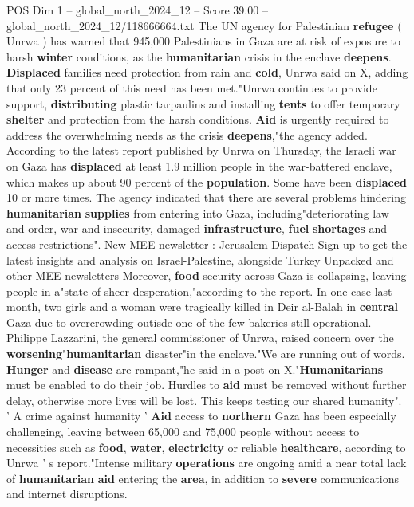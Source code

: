 \begin{textsample}{POS Dim 1 – global\_north\_2024\_12 – Score 39.00 – global\_north\_2024\_12/118666664.txt}  \label{ex:f1_pos_221}
The UN agency for Palestinian \textbf{refugee} ( Unrwa ) has warned that 945,000 Palestinians in Gaza are at risk of exposure to harsh \textbf{winter} conditions, as the \textbf{humanitarian} crisis in the enclave \textbf{deepens}. \textbf{Displaced} families need protection from rain and \textbf{cold}, Unrwa said on X, adding that only 23 percent of this need has been met."Unrwa continues to provide support, \textbf{distributing} plastic tarpaulins and installing \textbf{tents} to offer temporary \textbf{shelter} and protection from the harsh conditions. \textbf{Aid} is urgently required to address the overwhelming needs as the crisis \textbf{deepens},"the agency added.
According to the latest report published by Unrwa on Thursday, the Israeli war on Gaza has \textbf{displaced} at least 1.9 million people in the war-battered enclave, which makes up about 90 percent of the \textbf{population}.
Some have been \textbf{displaced} 10 or more times.
The agency indicated that there are several problems hindering \textbf{humanitarian} \textbf{supplies} from entering into Gaza, including"deteriorating law and order, war and insecurity, damaged \textbf{infrastructure}, \textbf{fuel} \textbf{shortages} and access restrictions".
New MEE newsletter : Jerusalem Dispatch Sign up to get the latest insights and analysis on Israel-Palestine, alongside Turkey Unpacked and other MEE newsletters Moreover, \textbf{food} security across Gaza is collapsing, leaving people in a"state of sheer desperation,"according to the report.
In one case last month, two girls and a woman were tragically killed in Deir al-Balah in \textbf{central} Gaza due to overcrowding outisde one of the few bakeries still operational.
Philippe Lazzarini, the general commissioner of Unrwa, raised concern over the \textbf{worsening}"\textbf{humanitarian} disaster"in the enclave."We are running out of words. \textbf{Hunger} and \textbf{disease} are rampant,"he said in a post on X."\textbf{Humanitarians} must be enabled to do their job.
Hurdles to \textbf{aid} must be removed without further delay, otherwise more lives will be lost.
This keeps testing our shared humanity". ' A crime against humanity ' \textbf{Aid} access to \textbf{northern} Gaza has been especially challenging, leaving between 65,000 and 75,000 people without access to necessities such as \textbf{food}, \textbf{water}, \textbf{electricity} or reliable \textbf{healthcare}, according to Unrwa ' s report."Intense military \textbf{operations} are ongoing amid a near total lack of \textbf{humanitarian} \textbf{aid} entering the \textbf{area}, in addition to \textbf{severe} communications and internet disruptions.

\end{textsample}
